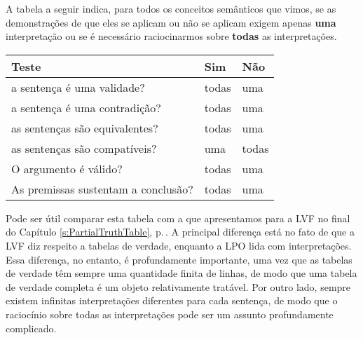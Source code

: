 A tabela a seguir indica, para todos os conceitos semânticos que vimos, se as demonstrações de que eles se aplicam ou não se aplicam exigem apenas \textbf{uma} interpretação ou se é necessário raciocinarmos sobre \textbf{todas} as interpretações.

\begin{center} %
\begin{tabular}{l l l}
\cline{1-3}
\textbf{Teste} & \textbf{Sim} & \textbf{Não}\\
 \hline
\cline{1-3}
a sentença é uma validade? & todas & uma \\
a sentença é uma contradição? &  todas  & uma \\
as sentenças são equivalentes? & todas & uma \\
as sentenças são compatíveis? & uma & todas \\
O argumento é válido? & todas & uma \\
As premissas sustentam a conclusão? & todas & uma \\
\cline{1-3}
\end{tabular}
\end{center}
\label{table.ModelOrArgument}




Pode ser útil comparar esta tabela com a que apresentamos para a LVF no final do Capítulo \ref{s:PartialTruthTable}, p.\,\pageref{t:TruthTable}.
A principal diferença está no fato de que a LVF diz respeito a tabelas de verdade, enquanto a LPO lida com interpretações.
Essa diferença, no entanto, é profundamente importante, uma vez que as tabelas de verdade têm sempre uma quantidade finita de linhas, de modo que uma tabela de verdade completa é um objeto relativamente tratável.
Por outro lado, sempre existem infinitas interpretações diferentes para cada sentença, de modo que o raciocínio sobre todas as interpretações pode ser um assunto profundamente complicado.
